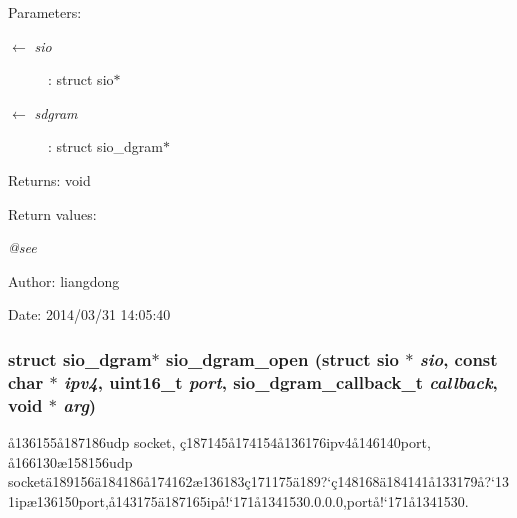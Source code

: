\begin{Desc}
\item[Parameters:]
\begin{description}
\item[\mbox{$\leftarrow$} {\em sio}]: struct sio$\ast$ \item[\mbox{$\leftarrow$} {\em sdgram}]: struct sio\_\-dgram$\ast$ \end{description}
\end{Desc}
\begin{Desc}
\item[Returns:]void \end{Desc}
\begin{Desc}
\item[Return values:]
\begin{description}
\item[{\em @see}]\end{description}
\end{Desc}
\begin{Desc}
\item[Author:]liangdong \end{Desc}
\begin{Desc}
\item[Date:]2014/03/31 14:05:40 \end{Desc}
\subsubsection{\setlength{\rightskip}{0pt plus 5cm}struct sio\_\-dgram$\ast$ sio\_\-dgram\_\-open (struct sio $\ast$ {\em sio}, const char $\ast$ {\em ipv4}, uint16\_\-t {\em port}, sio\_\-dgram\_\-callback\_\-t {\em callback}, void $\ast$ {\em arg})}\label{sio__dgram_8c_a2}


\aa{}136155\aa{}187186udp socket, \c{c}187145\aa{}174154\aa{}136176ipv4\aa{}146140port, \aa{}166130\ae{}158156udp socket\"{a}189156\"{a}184186\aa{}174162\ae{}136183\c{c}171175\"{a}189?`\c{c}148168\"{a}184141\aa{}133179\aa{}?`131ip\ae{}136150port,\aa{}143175\"{a}187165ip\aa{}!`171\aa{}1341530.0.0.0,port\aa{}!`171\aa{}1341530. 

